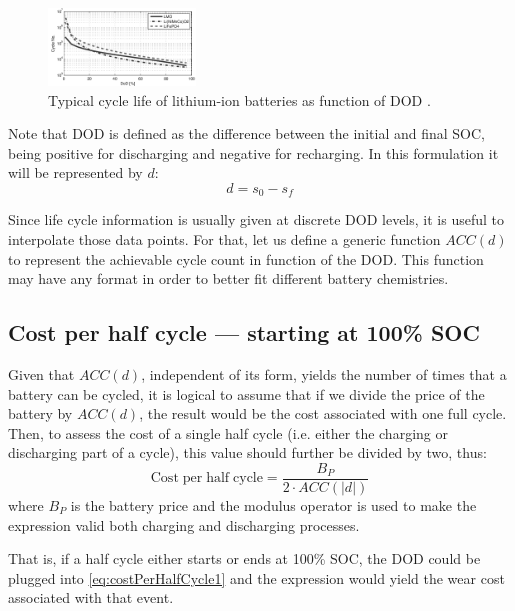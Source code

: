 \documentclass{ieeeaccess}
\begin{document}
    \begin{figure}[htbp]
        \centering
        \includegraphics[width=0.35\textwidth]{figures/acc_curves1.png}
        \caption{Typical cycle life of lithium-ion batteries as function of DOD \cite{XU2016}.}
        \label{fig:acc_curves1}
    \end{figure}

    Note that DOD is defined as the difference between the initial and final SOC, being positive for discharging and negative for recharging. In this formulation it will be represented by $d$:
    \begin{equation}
        d = s_{0}-s_{f}
        \label{eq:dod(s)}
    \end{equation}

    Since life cycle information is usually given at discrete DOD levels, it is useful to interpolate those data points. For that, let us define a generic function $ACC(d)$ to represent the achievable cycle count in function of the DOD. This function may have any format in order to better fit different battery chemistries.

    \subsection{Cost per half cycle --- starting at 100\% SOC}
    Given that $ACC(d)$, independent of its form, yields the number of times that a battery can be cycled, it is logical to assume that if we divide the price of the battery by $ACC(d)$, the result would be the cost associated with one full cycle. Then, to assess the cost of a single half cycle (i.e. either the charging or discharging part of a cycle), this value should further be divided by two, thus:
    \begin{equation}
        \mathrm{Cost \; per \; half \; cycle} = \frac{B_{P}}{2 \cdot ACC(|d|)}
        \label{eq:costPerHalfCycle1}
    \end{equation}
    where $B_{P}$ is the battery price and the modulus operator is used to make the expression valid both charging and discharging processes.

    That is, if a half cycle either starts or ends at 100\% SOC, the DOD could be plugged into \eqref{eq:costPerHalfCycle1} and the expression would yield the wear cost associated with that event.
\end{document}
